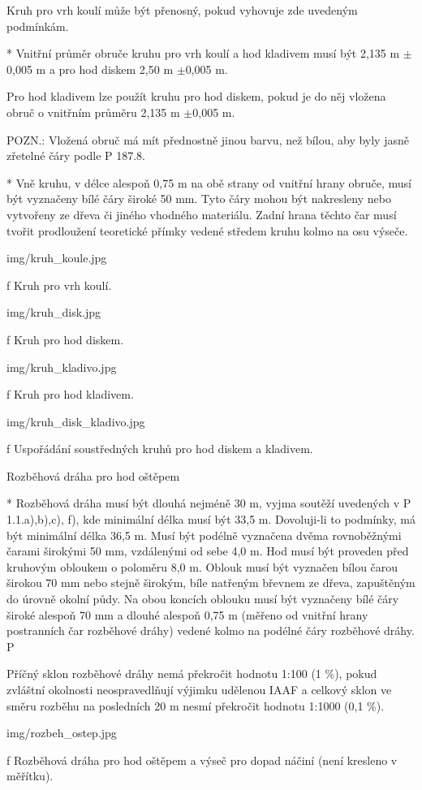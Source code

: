 Kruh pro vrh koulí může být přenosný, pokud vyhovuje zde uvedeným podmínkám.

* Vnitřní průměr obruče kruhu pro vrh koulí a hod kladivem musí být 2,135 m $\pm$0,005 m a pro hod diskem 2,50 m $\pm$0,005 m.

Pro hod kladivem lze použít kruhu pro hod diskem, pokud je do něj vložena obruč o vnitřním průměru 2,135 m $\pm$0,005 m.

POZN.: Vložená obruč má mít přednostně jinou barvu, než bílou, aby byly jasně zřetelné čáry podle P 187.8.

* Vně kruhu, v délce alespoň 0,75 m na obě strany od vnitřní hrany obruče, musí být vyznačeny bílé čáry široké 50 mm. Tyto čáry mohou být nakresleny nebo vytvořeny ze dřeva či jiného vhodného materiálu. Zadní hrana těchto čar musí tvořit prodloužení teoretické přímky vedené středem kruhu kolmo na osu výseče.

\picw=6cm \inspic img/kruh_koule.jpg
\caption/f Kruh pro vrh koulí.

\picw=6cm \inspic img/kruh_disk.jpg
\caption/f Kruh pro hod diskem.

\picw=5cm \inspic img/kruh_kladivo.jpg
\caption/f Kruh pro hod kladivem.

\picw=7cm \inspic img/kruh_disk_kladivo.jpg
\caption/f Uspořádání soustředných kruhů pro hod diskem a kladivem.

Rozběhová dráha pro hod oštěpem

* Rozběhová dráha musí být dlouhá nejméně 30 m, vyjma soutěží uvedených v P 1.1.a),b),c), f), kde minimální délka musí být 33,5 m. Dovoluji-li to podmínky, má být minimální délka 36,5 m. Musí být podélně vyznačena dvěma rovnoběžnými čarami širokými 50 mm, vzdálenými od sebe 4,0 m. Hod musí být proveden před kruhovým obloukem o poloměru 8,0 m. Oblouk musí být vyznačen bílou čarou širokou 70 mm nebo stejně širokým, bíle natřeným břevnem ze dřeva, zapuštěným do úrovně okolní půdy. Na obou koncích oblouku musí být vyznačeny bílé čáry široké alespoň 70 mm a dlouhé alespoň 0,75 m (měřeno od vnitřní hrany postranních čar rozběhové dráhy) vedené kolmo na podélné čáry rozběhové dráhy. P

Příčný sklon rozběhové dráhy nemá překročit hodnotu 1:100 (1 \%), pokud zvláštní okolnosti neospravedlňují výjimku udělenou IAAF a celkový sklon ve směru rozběhu na posledních 20 m nesmí překročit hodnotu 1:1000 (0,1 \%).

\picw=7cm \inspic img/rozbeh_ostep.jpg
\caption/f Rozběhová dráha pro hod oštěpem a výseč pro dopad náčiní (není kresleno v měřítku).

